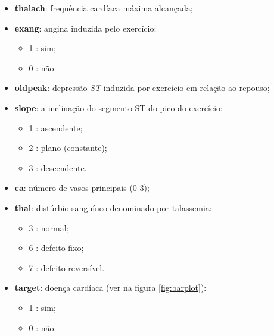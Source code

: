 \documentclass[a4paper]{report}
\begin{document}
{\begin{itemize}
\begin{itemize}
		\end{itemize}
	    \item \textbf{thalach}: frequência cardíaca máxima alcançada;
		\item \textbf{exang}: angina induzida pelo exercício:
		\begin{itemize}
			\item 1 : sim;
			\item 0 : não.
		\end{itemize}
	    \item \textbf{oldpeak}: depressão \textit{ST} induzida por exercício em relação ao repouso;
	    \item \textbf{slope}: a inclinação do segmento ST do pico do exercício:
	    \begin{itemize}
			\item 1 : ascendente;
			\item 2 : plano (constante);
			\item 3 : descendente.
		\end{itemize}
	    \item \textbf{ca}: número de vasos principais (0-3);
		\item \textbf{thal}: distúrbio sanguíneo denominado por talassemia:
		\begin{itemize}
			\item 3 : normal;
			\item 6 : defeito fixo;
			\item 7 : defeito reversível.
		\end{itemize}
	    \item \textbf{target}: doença cardíaca (ver na figura \ref{fig:barplot}):
	    \begin{itemize}
			\item 1 : sim;
			\item 0 : não.
		\end{itemize}


\end{itemize}}
\end{document}
